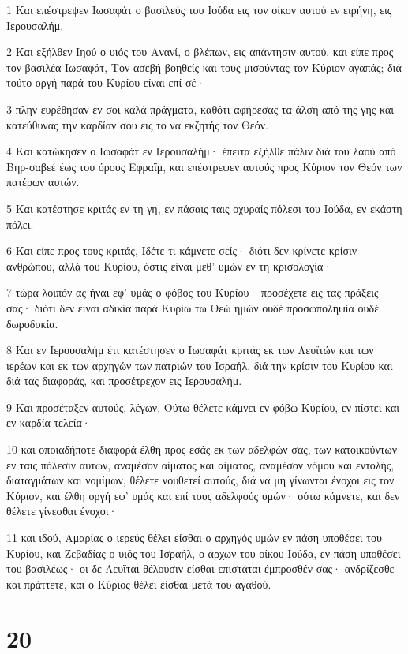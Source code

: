 \par 1 Και επέστρεψεν Ιωσαφάτ ο βασιλεύς του Ιούδα εις τον οίκον αυτού εν ειρήνη, εις Ιερουσαλήμ.
\par 2 Και εξήλθεν Ιηού ο υιός του Ανανί, ο βλέπων, εις απάντησιν αυτού, και είπε προς τον βασιλέα Ιωσαφάτ, Τον ασεβή βοηθείς και τους μισούντας τον Κύριον αγαπάς; διά τούτο οργή παρά του Κυρίου είναι επί σέ·
\par 3 πλην ευρέθησαν εν σοι καλά πράγματα, καθότι αφήρεσας τα άλση από της γης και κατεύθυνας την καρδίαν σου εις το να εκζητής τον Θεόν.
\par 4 Και κατώκησεν ο Ιωσαφάτ εν Ιερουσαλήμ· έπειτα εξήλθε πάλιν διά του λαού από Βηρ-σαβεέ έως του όρους Εφραΐμ, και επέστρεψεν αυτούς προς Κύριον τον Θεόν των πατέρων αυτών.
\par 5 Και κατέστησε κριτάς εν τη γη, εν πάσαις ταις οχυραίς πόλεσι του Ιούδα, εν εκάστη πόλει.
\par 6 Και είπε προς τους κριτάς, Ιδέτε τι κάμνετε σείς· διότι δεν κρίνετε κρίσιν ανθρώπου, αλλά του Κυρίου, όστις είναι μεθ' υμών εν τη κρισολογία·
\par 7 τώρα λοιπόν ας ήναι εφ' υμάς ο φόβος του Κυρίου· προσέχετε εις τας πράξεις σας· διότι δεν είναι αδικία παρά Κυρίω τω Θεώ ημών ουδέ προσωποληψία ουδέ δωροδοκία.
\par 8 Και εν Ιερουσαλήμ έτι κατέστησεν ο Ιωσαφάτ κριτάς εκ των Λευϊτών και των ιερέων και εκ των αρχηγών των πατριών του Ισραήλ, διά την κρίσιν του Κυρίου και διά τας διαφοράς, και προσέτρεχον εις Ιερουσαλήμ.
\par 9 Και προσέταξεν αυτούς, λέγων, Ούτω θέλετε κάμνει εν φόβω Κυρίου, εν πίστει και εν καρδία τελεία·
\par 10 και οποιαδήποτε διαφορά έλθη προς εσάς εκ των αδελφών σας, των κατοικούντων εν ταις πόλεσιν αυτών, αναμέσον αίματος και αίματος, αναμέσον νόμου και εντολής, διαταγμάτων και νομίμων, θέλετε νουθετεί αυτούς, διά να μη γίνωνται ένοχοι εις τον Κύριον, και έλθη οργή εφ' υμάς και επί τους αδελφούς υμών· ούτω κάμνετε, και δεν θέλετε γίνεσθαι ένοχοι·
\par 11 και ιδού, Αμαρίας ο ιερεύς θέλει είσθαι ο αρχηγός υμών εν πάση υποθέσει του Κυρίου, και Ζεβαδίας ο υιός του Ισραήλ, ο άρχων του οίκου Ιούδα, εν πάση υποθέσει του βασιλέως· οι δε Λευΐται θέλουσιν είσθαι επιστάται έμπροσθέν σας· ανδρίζεσθε και πράττετε, και ο Κύριος θέλει είσθαι μετά του αγαθού.

\chapter{20}

